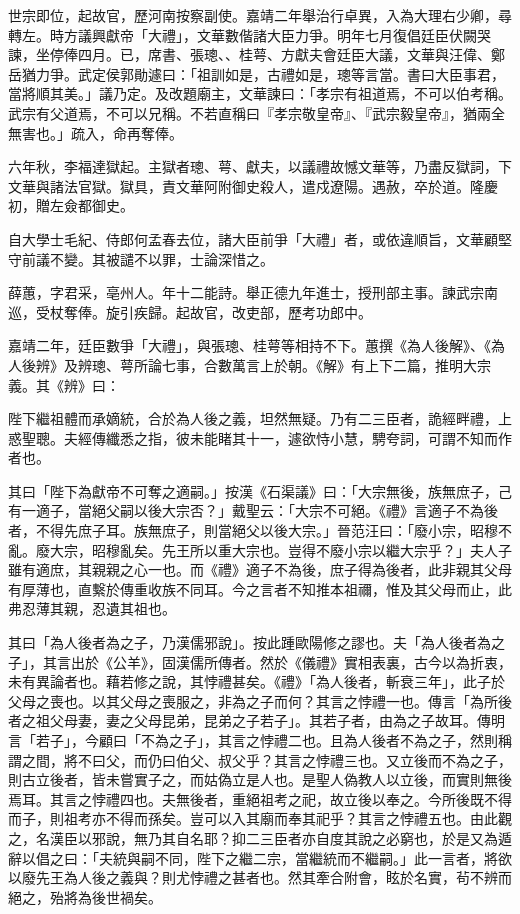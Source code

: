 \begin{pinyinscope}
世宗即位，起故官，歷河南按察副使。嘉靖二年舉治行卓異，入為大理右少卿，尋轉左。時方議興獻帝「大禮」，文華數偕諸大臣力爭。明年七月復倡廷臣伏闕哭諫，坐停俸四月。已，席書、張璁、、桂萼、方獻夫會廷臣大議，文華與汪偉、鄭岳猶力爭。武定侯郭勛遽曰：「祖訓如是，古禮如是，璁等言當。書曰大臣事君，當將順其美。」議乃定。及改題廟主，文華諫曰：「孝宗有祖道焉，不可以伯考稱。武宗有父道焉，不可以兄稱。不若直稱曰『孝宗敬皇帝』、『武宗毅皇帝』，猶兩全無害也。」疏入，命再奪俸。

六年秋，李福達獄起。主獄者璁、萼、獻夫，以議禮故憾文華等，乃盡反獄詞，下文華與諸法官獄。獄具，責文華阿附御史殺人，遣戍遼陽。遇赦，卒於道。隆慶初，贈左僉都御史。

自大學士毛紀、侍郎何孟春去位，諸大臣前爭「大禮」者，或依違順旨，文華顧堅守前議不變。其被譴不以罪，士論深惜之。

薛蕙，字君采，亳州人。年十二能詩。舉正德九年進士，授刑部主事。諫武宗南巡，受杖奪俸。旋引疾歸。起故官，改吏部，歷考功郎中。

嘉靖二年，廷臣數爭「大禮」，與張璁、桂萼等相持不下。蕙撰《為人後解》、《為人後辨》及辨璁、萼所論七事，合數萬言上於朝。《解》有上下二篇，推明大宗義。其《辨》曰：

陛下繼祖體而承嫡統，合於為人後之義，坦然無疑。乃有二三臣者，詭經畔禮，上惑聖聰。夫經傳纖悉之指，彼未能睹其十一，遽欲恃小慧，騁夸詞，可謂不知而作者也。

其曰「陛下為獻帝不可奪之適嗣。」按漢《石渠議》曰：「大宗無後，族無庶子，己有一適子，當絕父嗣以後大宗否？」戴聖云：「大宗不可絕。《禮》言適子不為後者，不得先庶子耳。族無庶子，則當絕父以後大宗。」晉范汪曰：「廢小宗，昭穆不亂。廢大宗，昭穆亂矣。先王所以重大宗也。豈得不廢小宗以繼大宗乎？」夫人子雖有適庶，其親親之心一也。而《禮》適子不為後，庶子得為後者，此非親其父母有厚薄也，直繫於傳重收族不同耳。今之言者不知推本祖禰，惟及其父母而止，此弗忍薄其親，忍遺其祖也。

其曰「為人後者為之子，乃漢儒邪說」。按此踵歐陽修之謬也。夫「為人後者為之子」，其言出於《公羊》，固漢儒所傳者。然於《儀禮》實相表裏，古今以為折衷，未有異論者也。藉若修之說，其悖禮甚矣。《禮》「為人後者，斬衰三年」，此子於父母之喪也。以其父母之喪服之，非為之子而何？其言之悖禮一也。傳言「為所後者之祖父母妻，妻之父母昆弟，昆弟之子若子」。其若子者，由為之子故耳。傳明言「若子」，今顧曰「不為之子」，其言之悖禮二也。且為人後者不為之子，然則稱謂之間，將不曰父，而仍曰伯父、叔父乎？其言之悖禮三也。又立後而不為之子，則古立後者，皆未嘗實子之，而姑偽立是人也。是聖人偽教人以立後，而實則無後焉耳。其言之悖禮四也。夫無後者，重絕祖考之祀，故立後以奉之。今所後既不得而子，則祖考亦不得而孫矣。豈可以入其廟而奉其祀乎？其言之悖禮五也。由此觀之，名漢臣以邪說，無乃其自名耶？抑二三臣者亦自度其說之必窮也，於是又為遁辭以倡之曰：「夫統與嗣不同，陛下之繼二宗，當繼統而不繼嗣。」此一言者，將欲以廢先王為人後之義與？則尤悖禮之甚者也。然其牽合附會，眩於名實，茍不辨而絕之，殆將為後世禍矣。


\end{pinyinscope}
